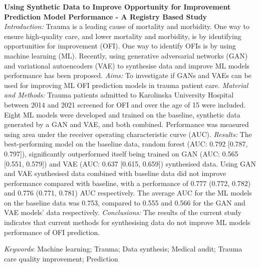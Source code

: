 \documentclass[12pt, a4paper]{article}
\begin{document}
\textbf{Using Synthetic Data to Improve Opportunity for Improvement Prediction Model Performance - A Registry Based
	Study } \\ \textit{Introduction:} Trauma is a leading cause of mortality and morbidity. One way to ensure high-quality
care, and lower mortality and morbidity, is by identifying opportunities for improvement (OFI). One way to identify
OFIs is by using machine learning (ML). Recently, using generative adversarial networks (GAN) and variational
autoencoders (VAE) to synthesise data and improve ML models performance has been proposed. \textit{Aims:} To
investigate if GANs and VAEs can be used for improving ML OFI prediction models in trauma patient care.
\textit{Material and Methods:} Trauma patients admitted to Karolinska University Hospital between 2014 and 2021
screened for OFI and over the age of 15 were included. Eight ML models were developed and trained on the baseline,
synthetic data generated by a GAN and VAE, and both combined. Performance was measured using area under the receiver operating
characteristic curve (AUC). \textit{Results:} The best-performing model on the baseline data, random forest (AUC: 0.792
	[0.787, 0.797]), significantly outperformed itself being trained on GAN (AUC: 0.565 [0.551, 0.579]) and VAE (AUC: 0.637
	[0.615, 0.659]) synthesised data. Using GAN and VAE synthesised data combined with baseline data did not improve
performance compared with baseline, with a performance of 0.777 (0.772, 0.782) and 0.776 (0.771, 0.781) AUC
respectively. The average AUC for the ML models on the baseline data was 0.753, compared to 0.555 and 0.566 for the GAN
and VAE models' data respectively. \textit{Conclusions:} The results of the current study indicates that current
methods for synthesising data do not improve ML models performance of OFI prediction.
\vfill

\textit{Keywords}: Machine learning; Trauma; Data synthesis; Medical audit; Trauma care quality improvement; Prediction

\newpage

\normalsize

\glsaddall
\printnoidxglossary[type=acronym,style=csuper]

\newpage

\end{document}

